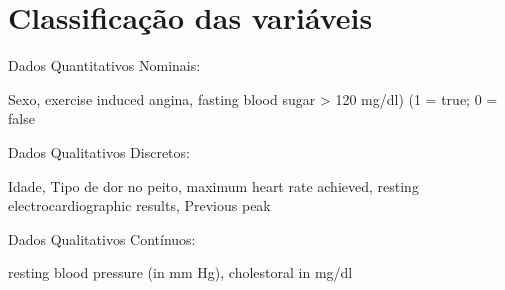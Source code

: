 \chapter{Classificação das variáveis}

    \setcounter{section}{0}

    Dados Quantitativos Nominais: 

    Sexo, exercise induced angina, fasting blood sugar > 120 mg/dl) (1 = true; 0 = false

    Dados Qualitativos Discretos:

    Idade, Tipo de dor no peito, maximum heart rate achieved, resting electrocardiographic results, Previous peak

    Dados Qualitativos Contínuos:

    resting blood pressure (in mm Hg), cholestoral in mg/dl

   